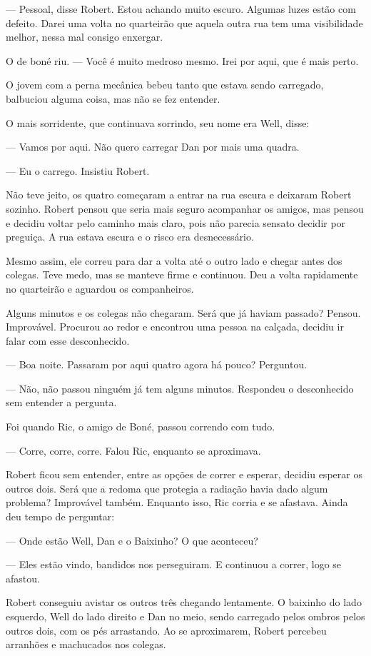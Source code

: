 \documentclass[a4paper,14pt]{book}
\begin{document}
— Pessoal, disse Robert. Estou achando muito escuro. Algumas luzes estão com defeito. Darei uma volta no quarteirão que aquela outra rua tem uma visibilidade melhor, nessa mal consigo enxergar.

O de boné riu. — Você é muito medroso mesmo. Irei por aqui, que é mais perto.

O jovem com a perna mecânica bebeu tanto que estava sendo carregado, balbuciou alguma coisa, mas não se fez entender.

O mais sorridente, que continuava sorrindo, seu nome era Well, disse:

— Vamos por aqui. Não quero carregar Dan por mais uma quadra.

— Eu o carrego. Insistiu Robert.

Não teve jeito, os quatro começaram a entrar na rua escura e deixaram Robert sozinho. Robert pensou que seria mais seguro acompanhar os amigos, mas pensou e decidiu voltar pelo caminho mais claro, pois não parecia sensato decidir por preguiça. A rua estava escura e o risco era desnecessário.

Mesmo assim, ele correu para dar a volta até o outro lado e chegar antes dos colegas. Teve medo, mas se manteve firme e continuou. Deu a volta rapidamente no quarteirão e aguardou os companheiros.

Alguns minutos e os colegas não chegaram. Será que já haviam passado? Pensou. Improvável. Procurou ao redor e encontrou uma pessoa na calçada, decidiu ir falar com esse desconhecido.

— Boa noite. Passaram por aqui quatro agora há pouco? Perguntou.

— Não, não passou ninguém já tem alguns minutos. Respondeu o desconhecido sem entender a pergunta.

Foi quando Ric, o amigo de Boné, passou correndo com tudo.

— Corre, corre, corre. Falou Ric, enquanto se aproximava.

Robert ficou sem entender, entre as opções de correr e esperar, decidiu esperar os outros dois. Será que a redoma que protegia a radiação havia dado algum problema? Improvável também. Enquanto isso, Ric corria e se afastava. Ainda deu tempo de perguntar:

— Onde estão Well, Dan e o Baixinho? O que aconteceu?

— Eles estão vindo, bandidos nos perseguiram. E continuou a correr, logo se afastou.

Robert conseguiu avistar os outros três chegando lentamente. O baixinho do lado esquerdo, Well do lado direito e Dan no meio, sendo carregado pelos ombros pelos outros dois, com os pés arrastando. Ao se aproximarem, Robert percebeu arranhões e machucados nos colegas.
\end{document}
